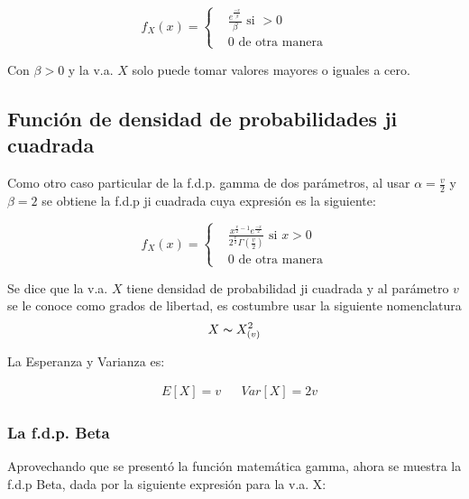 \begin{equation}
    f_X( x )=\begin{cases}
         & \frac{e^{\frac{-x}{\beta}}}{\beta}\text{ si }>0 \\
         & 0 \text{ de otra manera}\end{cases}
\end{equation}

Con $\beta >0$ y la v.a. $X$ solo puede tomar valores mayores o
iguales a cero.

\subsection{Función de densidad de probabilidades ji cuadrada}

Como otro caso particular de la f.d.p. gamma de dos parámetros,
al usar $\alpha=\frac{v}{2}$ y $\beta =2$ se obtiene la f.d.p ji cuadrada cuya expresión
es la siguiente:

\begin{equation}
    f_X(x)=\begin{cases}
         & \frac{x^{\frac{v}{2}-1}e^{\frac{-x}{2}}}{2^{\frac{v}{2}}\Gamma\left(\frac{v}{2}\right )}\text{ si } x>0 \\
         & 0 \text{ de otra manera}
    \end{cases}
\end{equation}

\begin{notation}
    Se dice que la v.a. $X$ tiene densidad de probabilidad ji cuadrada y
    al parámetro $v$ se le conoce como grados de libertad, es
    costumbre usar la siguiente nomenclatura
    \begin{equation}
        X \thicksim  X_{(v)}^2
    \end{equation}
\end{notation}


La Esperanza y Varianza es:

\begin{align*}
     & E\left[X\right] =v &  & Var\left[X\right] =2 v
\end{align*}

\subsubsection{La f.d.p. Beta}

Aprovechando que se presentó la función matemática
gamma, ahora se muestra la f.d.p Beta, dada por la
siguiente expresión para la v.a. X:

